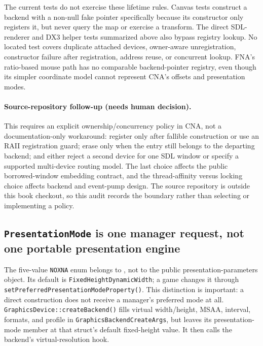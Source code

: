 The current tests do not exercise these lifetime rules.  Canvas tests construct a backend with a
non-null fake pointer specifically because its constructor only registers it, but never query the
map or exercise a transform.  The direct SDL-renderer and DX3 helper tests summarized above also
bypass registry lookup.  No located test covers duplicate attached devices, owner-aware
unregistration, constructor failure after registration, address reuse, or concurrent lookup.
FNA's ratio-based mouse path has no comparable backend-pointer registry, even though its simpler
coordinate model cannot represent CNA's offsets and presentation modes.

\paragraph{Source-repository follow-up (needs human decision).}
This requires an explicit ownership/concurrency policy in CNA, not a documentation-only
workaround: register only after fallible construction or use an RAII registration guard; erase
only when the entry still belongs to the departing backend; and either reject a second device for
one SDL window or specify a supported multi-device routing model.  The last choice affects the
public borrowed-window embedding contract, and the thread-affinity versus locking choice affects
backend and event-pump design.  The source repository is outside this book checkout, so this
audit records the boundary rather than selecting or implementing a policy.

\subsection{\texttt{PresentationMode} is one manager request, not one portable presentation engine}
\label{sec:backend-presentation-mode-matrix}

The five-value \texttt{NOXNA}  enum belongs to
, not to the public presentation-parameters object. Its default
is \texttt{FixedHeight\allowbreak Dynamic\allowbreak Width}; a game changes it through
\texttt{setPreferred\allowbreak Presentation\allowbreak Mode\allowbreak Property()}. This
distinction is important: a direct  construction does not receive a
manager's preferred mode at all. \texttt{GraphicsDevice::create\allowbreak Backend()} fills
virtual width/height, MSAA, interval, formats, and profile in
\texttt{GraphicsBackend\allowbreak CreateArgs}, but leaves its presentation-mode member at that
struct's default fixed-height value. It then calls the backend's virtual-resolution hook.

